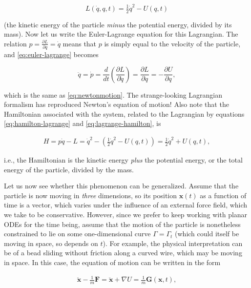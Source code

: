\documentclass[11pt]{report}
\theoremstyle{plain}
\theoremstyle{definition}
\begin{document}
\[
L(\dot{q},q,t) = \tfrac12 \dot{q}^2 - U(q,t)
\]

\noindent (the kinetic energy of the particle \emph{minus} the
potential energy, divided by its mass). Now let us
write the Euler-Lagrange equation for this Lagrangian.
The relation
$p=\frac{\partial L}{\partial q} = \dot{q}$ means that
$p$ is simply equal to the velocity of the particle,
and \eqref{eq:euler-lagrange} becomes

\[
\ddot{q} = \dot{p} = \frac{d}{dt} \left( \frac{\partial L}{\partial \dot{q}} \right) = \frac{\partial L}{\partial q} = -\frac{\partial U}{\partial q},
\]

\noindent which is the same as \eqref{eq:newtonmotion}. The
strange-looking Lagrangian formalism has reproduced
Newton's equation of motion! Also note that the
Hamiltonian associated with the system, related to the
Lagrangian by equations \eqref{eq:hamilton-lagrange} and
\eqref{eq:lagrange-hamilton}, is

\begin{align*}
H = p \dot{q} - L = \dot{q}^2 - \left( \tfrac12 \dot{q}^2 - U(q,t) \right)
= \tfrac12 \dot{q}^2 + U(q,t),
\end{align*}

\noindent i.e., the Hamiltonian is the kinetic energy \emph{plus} the
potential energy, or the total energy of the particle,
divided by the mass.

Let us now see whether this phenomenon can be
generalized. Assume that the particle is now moving in
\emph{three} dimensions, so its position $\mathbf{x}(t)$ as
a function of time is a vector, which varies under the
influence of an external force field, which we take to
be conservative. However, since we prefer to keep
working with planar ODEs for the time being, assume
that the motion of the particle is nonetheless
constrained to lie on some one-dimensional curve
$\Gamma=\Gamma_t$ (which could itself be moving in
space, so depends on $t$). For example, the physical
interpretation can be of a bead sliding without
friction along a curved wire, which may be moving in
space. In this case, the equation of motion can be
written in the form

\begin{equation*} \tag{8}\label{eq:curve-forces}
\begin{split}
\ddot{\mathbf{x}} - \frac{1}{m}\mathbf{F} = \ddot{\mathbf{x}} + \nabla U = \frac{1}{m} \mathbf{G}(\mathbf{x},t),
\end{split}
\end{equation*}
\end{document}
